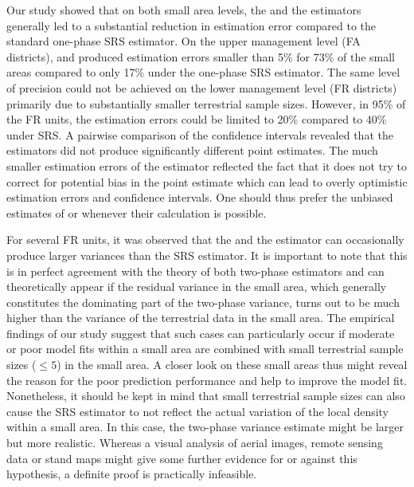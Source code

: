 Our study showed that on both small area levels, the \psmall{} and the \extpsynth{} estimators generally led to a substantial reduction in estimation error compared to the standard one-phase SRS estimator. On the upper management level (FA districts), \psmall{} and \extpsynth{} produced estimation errors smaller than 5\% for 73\% of the small areas compared to only 17\% under the one-phase SRS estimator. The same level of precision could not be achieved on the lower management level (FR districts) primarily due to substantially smaller terrestrial sample sizes. However, in 95\% of the FR units, the estimation errors could be limited to 20\% compared to 40\% under SRS. A pairwise comparison of the confidence intervals revealed that the estimators did not produce significantly different point estimates. The much smaller estimation errors of the \psynth{} estimator reflected the fact that it does not try to correct for potential bias in the point estimate which can lead to overly optimistic estimation errors and confidence intervals. One should thus prefer the unbiased estimates of \psmall{} or \extpsynth{} whenever their calculation is possible.\par

For several FR units, it was observed that the \psmall{} and the \extpsynth{} estimator can occasionally produce larger variances than the SRS estimator. It is important to note that this is in perfect agreement with the theory of both two-phase estimators and can theoretically appear if the residual variance in the small area, which generally constitutes the dominating part of the two-phase variance, turns out to be much higher than the variance of the terrestrial data in the small area. The empirical findings of our study suggest that such cases can particularly occur if moderate or poor model fits within a small area are combined with small terrestrial sample sizes ($\leq 5$) in the small area. A closer look on these small areas thus might reveal the reason for the poor prediction performance and help to improve the model fit. Nonetheless, it should be kept in mind that small terrestrial sample sizes can also cause the SRS estimator to not reflect the actual variation of the local density within a small area. In this case, the two-phase variance estimate might be larger but more realistic. Whereas a visual analysis of aerial images, remote sensing data or stand maps might give some further evidence for or against this hypothesis, a definite proof is practically infeasible.\par

